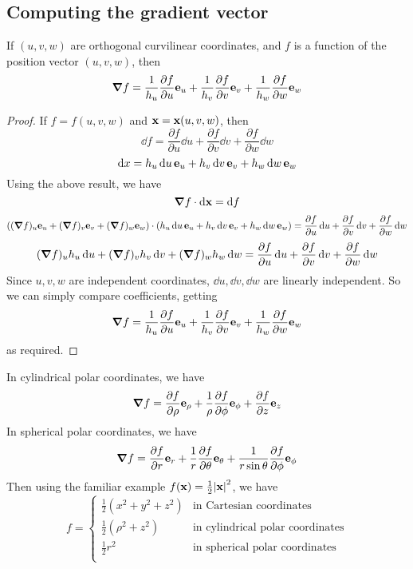 \subsection{Computing the gradient vector}
\begin{proposition}
	If \((u, v, w)\) are orthogonal curvilinear coordinates, and \(f\) is a function of the position vector \((u, v, w)\), then
	\[
		\grad f = \frac{1}{h_u}\frac{\partial f}{\partial u}\vb e_u + \frac{1}{h_v}\frac{\partial f}{\partial v}\vb e_v + \frac{1}{h_w}\frac{\partial f}{\partial w}\vb e_w
	\]
\end{proposition}
\begin{proof}
	If \(f = f(u, v, w)\) and \(\vb x = \vb x(u, v, w)\), then
	\[
		\dd{f} = \frac{\partial f}{\partial u}\dd{u} + \frac{\partial f}{\partial v}\dd{v} + \frac{\partial f}{\partial w}\dd{w}
	\]
	\[
		\dd{x} = h_u \dd{u} \vb e_u + h_v \dd{v} \vb e_v + h_w \dd{w} \vb e_w
	\]
	Using the above result, we have
	\[
		\grad f \cdot \dd \vb x = \dd{f}
	\]
	\[
		\left( (\grad f)_u \vb e_u + (\grad f)_v \vb e_v + (\grad f)_w \vb e_w \right) \cdot \left( h_u \dd{u} \vb e_u + h_v \dd{v} \vb e_v + h_w \dd{w} \vb e_w \right) = \frac{\partial f}{\partial u}\dd{u} + \frac{\partial f}{\partial v}\dd{v} + \frac{\partial f}{\partial w}\dd{w}
	\]
	\[
		(\grad f)_u h_u \dd{u} + (\grad f)_v h_v \dd{v} + (\grad f)_w h_w \dd{w} = \frac{\partial f}{\partial u}\dd{u} + \frac{\partial f}{\partial v}\dd{v} + \frac{\partial f}{\partial w}\dd{w}
	\]
	Since \(u, v, w\) are independent coordinates, \(\dd{u}, \dd{v}, \dd{w}\) are linearly independent.
	So we can simply compare coefficients, getting
	\[
		\grad f = \frac{1}{h_u}\frac{\partial f}{\partial u}\vb e_u + \frac{1}{h_v}\frac{\partial f}{\partial v}\vb e_v + \frac{1}{h_w}\frac{\partial f}{\partial w}\vb e_w
	\]
	as required.
\end{proof}
In cylindrical polar coordinates, we have
\[
	\grad f = \frac{\partial f}{\partial \rho} \vb e_\rho + \frac{1}{\rho} \frac{\partial f}{\partial \phi} \vb e_\phi + \frac{\partial f}{\partial z} \vb e_z
\]
In spherical polar coordinates, we have
\[
	\grad f = \frac{\partial f}{\partial r} \vb e_r + \frac{1}{r} \frac{\partial f}{\partial \theta} \vb e_\theta + \frac{1}{r\sin\theta} \frac{\partial f}{\partial \phi} \vb e_\phi
\]
Then using the familiar example \(f(\vb x) = \frac{1}{2}\abs{\vb x}^2\), we have
\[
	f = \begin{cases}
		\frac{1}{2}(x^2 + y^2 + z^2) & \text{in Cartesian coordinates}         \\
		\frac{1}{2}(\rho^2 + z^2)    & \text{in cylindrical polar coordinates} \\
		\frac{1}{2}r^2               & \text{in spherical polar coordinates}   \\
	\end{cases}
\]
